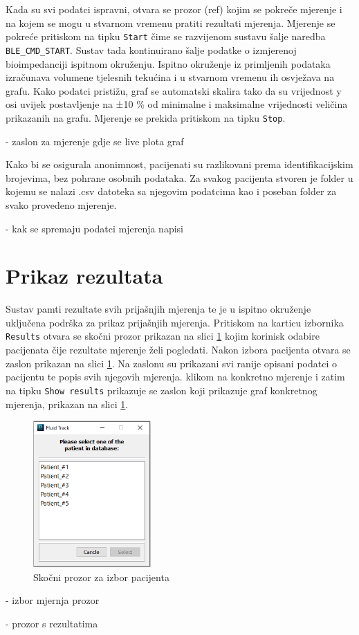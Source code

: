 \documentclass[../diplomski_rad.tex]{subfiles}
\begin{document}
Kada su svi podatci ispravni, otvara se prozor (ref) kojim se pokreče mjerenje i na kojem 
se mogu u stvarnom vremenu pratiti rezultati mjerenja. 
Mjerenje se pokreće pritiskom na tipku \texttt{Start} čime se razvijenom sustavu šalje naredba \texttt{BLE\_CMD\_START}. 
Sustav tada kontinuirano šalje podatke o izmjerenoj bioimpedanciji ispitnom okruženju. 
Ispitno okruženje iz primljenih podataka izračunava volumene tjelesnih tekućina i u stvarnom vremenu ih osvježava na grafu. 
Kako podatci pristižu, graf se automatski skalira tako da su vrijednost y osi uvijek postavljenje na ±10 \% 
od minimalne i maksimalne vrijednosti veličina prikazanih na grafu.   
Mjerenje se prekida pritiskom na tipku \texttt{Stop}.

- zaslon za mjerenje gdje se live plota graf

Kako bi se osigurala anonimnost, pacijenati su razlikovani prema identifikacijskim brojevima, bez pohrane osobnih podataka. 
Za svakog pacijenta stvoren je folder u kojemu se nalazi .csv datoteka sa njegovim podatcima kao i poseban folder za 
svako provedeno mjerenje.

- kak se spremaju podatci mjerenja napisi

\section{Prikaz rezultata}

Sustav pamti rezultate svih prijašnjih mjerenja te je u ispitno okruženje uključena podrška za prikaz prijašnjih mjerenja. 
Pritiskom na karticu izbornika \texttt{Results} otvara se skočni prozor prikazan na slici \ref{slk:select_patient} kojim korinisk odabire pacijenata 
čije rezultate mjerenje želi pogledati. Nakon izbora pacijenta otvara se zaslon prikazan na slici \ref{}. 
Na zaslonu su prikazani svi ranije opisani podatci o pacijentu te popis svih njegovih mjerenja. 
klikom na konkretno mjerenje i zatim na tipku \texttt{Show results} prikazuje se zaslon koji prikazuje 
graf konkretnog mjerenja, prikazan na slici \ref{}. 

\begin{figure}[htb]
    \centering
    \includegraphics[width=0.4\textwidth]{Figures/select_patient.png} 
    \caption{Skočni prozor za izbor pacijenta}
    \label{slk:select_patient}
\end{figure}

- izbor mjernja prozor

- prozor s rezultatima
\end{document}
